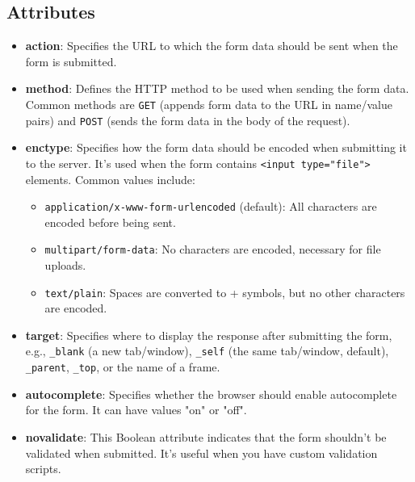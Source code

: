 \documentclass{report}
\begin{document}
    \bigbreak \noindent 
    \subsection{Attributes}
    \bigbreak \noindent 
    \begin{itemize}
        \item \textbf{action}: Specifies the URL to which the form data should be sent when the form is submitted.
        \item \textbf{method}: Defines the HTTP method to be used when sending the form data. Common methods are \texttt{GET} (appends form data to the URL in name/value pairs) and \texttt{POST} (sends the form data in the body of the request).
        \item \textbf{enctype}: Specifies how the form data should be encoded when submitting it to the server. It's used when the form contains \texttt{<input type="file">} elements. Common values include:
        \begin{itemize}
            \item \texttt{application/x-www-form-urlencoded} (default): All characters are encoded before being sent.
            \item \texttt{multipart/form-data}: No characters are encoded, necessary for file uploads.
            \item \texttt{text/plain}: Spaces are converted to + symbols, but no other characters are encoded.
        \end{itemize}
        \item \textbf{target}: Specifies where to display the response after submitting the form, e.g., \texttt{\_blank} (a new tab/window), \texttt{\_self} (the same tab/window, default), \texttt{\_parent}, \texttt{\_top}, or the name of a frame.
        \item \textbf{autocomplete}: Specifies whether the browser should enable autocomplete for the form. It can have values "on" or "off".
        \item \textbf{novalidate}: This Boolean attribute indicates that the form shouldn't be validated when submitted. It's useful when you have custom validation scripts.
    \end{itemize}


    \bigbreak \noindent 
\end{document}
